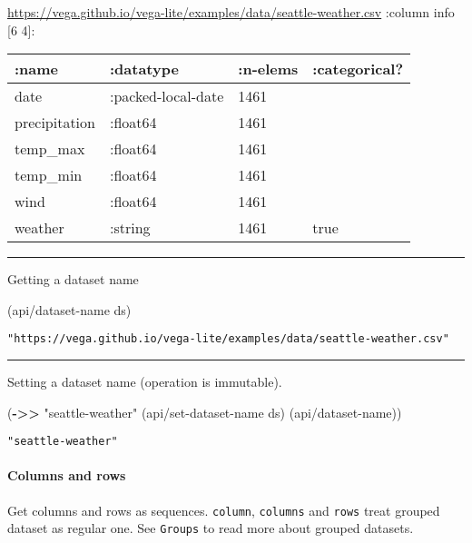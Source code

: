 \documentclass[]{article}
\newenvironment{Shaded}{\begin{snugshade}}{\end{snugshade}}
\newcommand{\KeywordTok}[1]{\textcolor[rgb]{0.13,0.29,0.53}{\textbf{#1}}}
\newcommand{\NormalTok}[1]{#1}
\newcommand{\StringTok}[1]{\textcolor[rgb]{0.31,0.60,0.02}{#1}}
\let\oldparagraph\paragraph
\renewcommand{\paragraph}[1]{\oldparagraph{#1}\mbox{}}
\begin{document}
\url{https://vega.github.io/vega-lite/examples/data/seattle-weather.csv}
:column info {[}6 4{]}:

\begin{longtable}[]{@{}llll@{}}
\toprule
:name & :datatype & :n-elems & :categorical?\tabularnewline
\midrule
\endhead
date & :packed-local-date & 1461 &\tabularnewline
precipitation & :float64 & 1461 &\tabularnewline
temp\_max & :float64 & 1461 &\tabularnewline
temp\_min & :float64 & 1461 &\tabularnewline
wind & :float64 & 1461 &\tabularnewline
weather & :string & 1461 & true\tabularnewline
\bottomrule
\end{longtable}

\begin{center}\rule{0.5\linewidth}{0.5pt}\end{center}

Getting a dataset name

\begin{Shaded}
\begin{Highlighting}[]
\NormalTok{(api/dataset-name ds)}
\end{Highlighting}
\end{Shaded}

\begin{verbatim}
"https://vega.github.io/vega-lite/examples/data/seattle-weather.csv"
\end{verbatim}

\begin{center}\rule{0.5\linewidth}{0.5pt}\end{center}

Setting a dataset name (operation is immutable).

\begin{Shaded}
\begin{Highlighting}[]
\NormalTok{(}\KeywordTok{->>} \StringTok{"seattle-weather"}
\NormalTok{     (api/set-dataset-name ds)}
\NormalTok{     (api/dataset-name))}
\end{Highlighting}
\end{Shaded}

\begin{verbatim}
"seattle-weather"
\end{verbatim}

\hypertarget{columns-and-rows}{%
\paragraph{Columns and rows}\label{columns-and-rows}}

Get columns and rows as sequences. \texttt{column}, \texttt{columns} and
\texttt{rows} treat grouped dataset as regular one. See \texttt{Groups}
to read more about grouped datasets.
\end{document}
